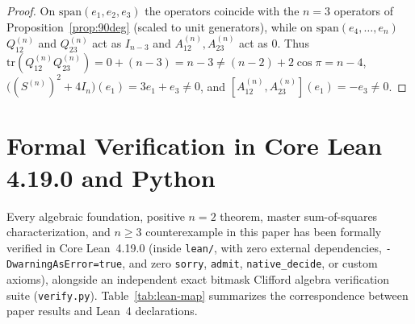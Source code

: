 \documentclass[11pt]{article}
\theoremstyle{definition}
\newcommand{\tr}{\mathrm{tr}}
\begin{document}
\begin{proof}
On $\mathrm{span}(e_1, e_2, e_3)$ the operators coincide with the $n = 3$ operators of
Proposition~\ref{prop:90deg} (scaled to unit generators), while on $\mathrm{span}(e_4, \dots, e_n)$
$Q_{12}^{(n)}$ and $Q_{23}^{(n)}$ act as $I_{n-3}$ and $A_{12}^{(n)}, A_{23}^{(n)}$ act as $0$.
Thus $\tr(Q_{12}^{(n)} Q_{23}^{(n)}) = 0 + (n - 3) = n - 3 \neq (n - 2) + 2\cos\pi = n - 4$,
$\bigl((S^{(n)})^2 + 4I_n\bigr)(e_1) = 3e_1 + e_3 \neq 0$, and
$[A_{12}^{(n)}, A_{23}^{(n)}](e_1) = -e_3 \neq 0$.
\end{proof}

\section{Formal Verification in Core Lean 4.19.0 and Python}

Every algebraic foundation, positive $n = 2$ theorem, master sum-of-squares characterization,
and $n \ge 3$ counterexample in this paper has been formally verified in Core Lean~4.19.0
(inside \texttt{lean/}, with zero external dependencies, \texttt{-DwarningAsError=true}, and
zero \texttt{sorry}, \texttt{admit}, \texttt{native\_decide}, or custom axioms), alongside an
independent exact bitmask Clifford algebra verification suite (\texttt{verify.py}).
Table~\ref{tab:lean-map} summarizes the correspondence between paper results and Lean~4
declarations.
\end{document}
